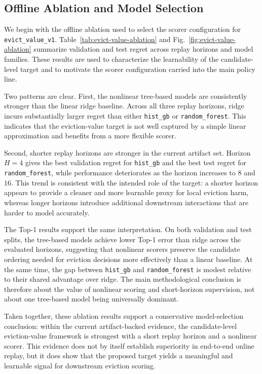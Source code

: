 \documentclass[preprint,12pt]{elsarticle}
\begin{document}
\subsection{Offline Ablation and Model Selection}
\label{subsec:main_results}

We begin with the offline ablation used to select the scorer configuration for \texttt{evict\_value\_v1}. Table~\ref{tab:evict-value-ablation} and Fig.~\ref{fig:evict-value-ablation} summarize validation and test regret across replay horizons and model families. These results are used to characterize the learnability of the candidate-level target and to motivate the scorer configuration carried into the main policy line.

Two patterns are clear. First, the nonlinear tree-based models are consistently stronger than the linear ridge baseline. Across all three replay horizons, ridge incurs substantially larger regret than either \texttt{hist\_gb} or \texttt{random\_forest}. This indicates that the eviction-value target is not well captured by a simple linear approximation and benefits from a more flexible scorer.

Second, shorter replay horizons are stronger in the current artifact set. Horizon $H=4$ gives the best validation regret for \texttt{hist\_gb} and the best test regret for \texttt{random\_forest}, while performance deteriorates as the horizon increases to $8$ and $16$. This trend is consistent with the intended role of the target: a shorter horizon appears to provide a cleaner and more learnable proxy for local eviction harm, whereas longer horizons introduce additional downstream interactions that are harder to model accurately.

The Top-1 results support the same interpretation. On both validation and test splits, the tree-based models achieve lower Top-1 error than ridge across the evaluated horizons, suggesting that nonlinear scorers preserve the candidate ordering needed for eviction decisions more effectively than a linear baseline. At the same time, the gap between \texttt{hist\_gb} and \texttt{random\_forest} is modest relative to their shared advantage over ridge. The main methodological conclusion is therefore about the value of nonlinear scoring and short-horizon supervision, not about one tree-based model being universally dominant.

Taken together, these ablation results support a conservative model-selection conclusion: within the current artifact-backed evidence, the candidate-level eviction-value framework is strongest with a short replay horizon and a nonlinear scorer. This evidence does not by itself establish superiority in end-to-end online replay, but it does show that the proposed target yields a meaningful and learnable signal for downstream eviction scoring.
\end{document}
